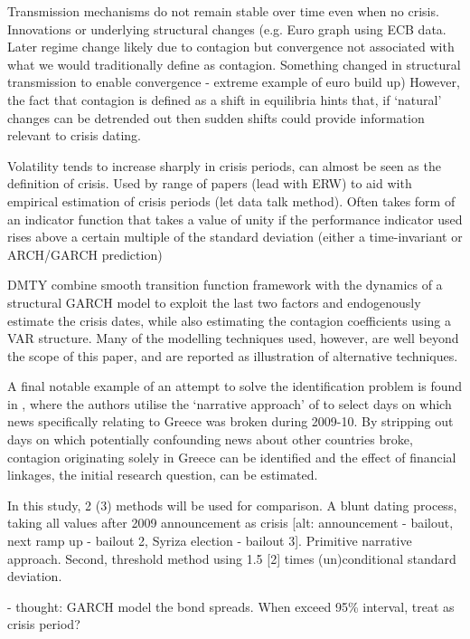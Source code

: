 \documentclass[../base.tex]{subfiles}
\begin{document}
Transmission mechanisms do not remain stable over time even when no crisis. Innovations or underlying structural changes (e.g. Euro graph using ECB data. Later regime change likely due to contagion but convergence not associated with what we would traditionally define as contagion. Something changed in structural transmission to enable convergence - extreme example of euro build up) However, the fact that contagion is defined as a shift in equilibria hints that, if `natural' changes can be detrended out then sudden shifts could provide information relevant to crisis dating.

Volatility tends to increase sharply in crisis periods, can almost be seen as the definition of crisis. Used by range of papers (lead with ERW) to aid with empirical estimation of crisis periods (let data talk method). Often takes form of an indicator function that takes a value of unity if the performance indicator used rises above a certain multiple of the standard deviation (either a time-invariant or ARCH/GARCH prediction)

DMTY combine smooth transition function framework with the dynamics of a structural GARCH model to exploit the last two factors and endogenously estimate the crisis dates, while also estimating the contagion coefficients using a VAR structure. Many of the modelling techniques used, however, are well beyond the scope of this paper, and are reported as illustration of alternative techniques.

A final notable example of an attempt to solve the identification problem is found in \cite{brutti2012transmission}, where the authors utilise the `narrative approach' of \cite{romer1989does} to select days on which news specifically relating to Greece was broken during 2009-10. By stripping out days on which potentially confounding news about other countries broke, contagion originating solely in Greece can be identified and the effect of financial linkages, the initial research question, can be estimated.  

In this study, 2 (3) methods will be used for comparison. A blunt dating process, taking all values after 2009 announcement as crisis [alt: announcement - bailout, next ramp up - bailout 2, Syriza election - bailout 3]. Primitive narrative approach. Second, threshold method using 1.5 [2] times (un)conditional standard deviation. 

- thought: GARCH model the bond spreads. When exceed 95\% interval, treat as crisis period? 
\end{document}
